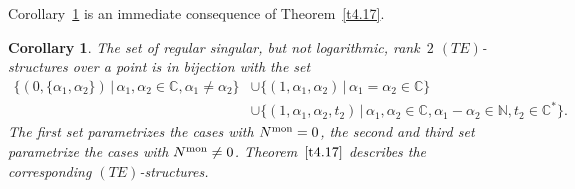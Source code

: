 \documentclass[pdftex]{sigma}%
\numberwithin{equation}{section}
\numberwithin{figure}{section}
\newcommand{\N}{{\mathbb N}}
\newcommand{\C}{{\mathbb C}}
\newtheorem{Corollary}[Theorem]{Corollary}
\begin{document}
Corollary~\ref{t4.18} is an immediate consequence of
Theorem~\ref{t4.17}.

\begin{Corollary}\label{t4.18}
The set of regular singular, but not logarithmic,
rank~$2$ $(TE)$-structures over a point is in bijection
with the set
\begin{align*}
\{(0,\{\alpha_1,\alpha_2\})\,|\, \alpha_1,\alpha_2\in\C,\alpha_1\neq\alpha_2\}
&\cup\{(1,\alpha_1,\alpha_2)\,|\, \alpha_1=\alpha_2\in\C\}
\\
&\cup\{(1,\alpha_1,\alpha_2,t_2)\,|\, \alpha_1,\alpha_2\in\C,
\alpha_1-\alpha_2\in \N,t_2\in\C^*\}.
\end{align*}
The first set parametrizes the cases with $N^{\rm mon}=0$,
the second and third set parametrize the cases with
$N^{\rm mon}\neq 0$. Theorem~$\ref{t4.17}$ describes the
corresponding $(TE)$-structures.
\end{Corollary}
\end{document}
